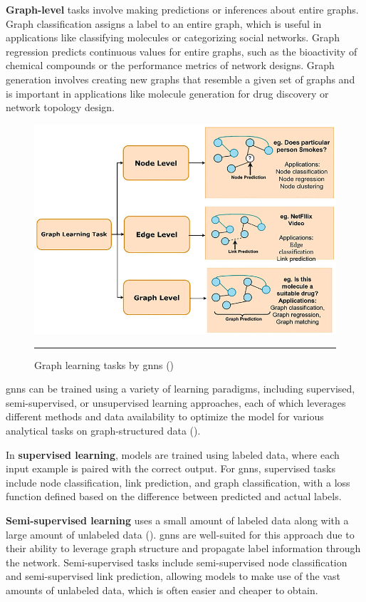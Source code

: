 \textbf{Graph-level} tasks involve making predictions or inferences about entire graphs.
Graph classification assigns a label to an entire graph, which is useful in applications like classifying molecules or categorizing social networks.
Graph regression predicts continuous values for entire graphs, such as the bioactivity of chemical compounds or the performance metrics of network designs.
Graph generation involves creating new graphs that resemble a given set of graphs and is important in applications like molecule generation for drug discovery or network topology design.

\begin{figure}[htbp]
    \centering
 \includegraphics[width=.9\textwidth]{03_Figures/literature-review/gnn-graph-learning-tasks-summary.png}
     \rule{35em}{0.5pt}
    \caption{Graph learning tasks by \glspl{gnn} (\cite{Khemani2024})} 
 \label{fig:gnn-graph-learning-tasks-summary}
\end{figure}

\glspl{gnn} can be trained using a variety of learning paradigms, including supervised, semi-supervised, or unsupervised learning approaches, each of which leverages different methods and data availability to optimize the model for various analytical tasks on graph-structured data (\cite{Zhou2020,Wu2021}).

In \textbf{supervised learning}, models are trained using labeled data, where each input example is paired with the correct output.
For \glspl{gnn}, supervised tasks include node classification, link prediction, and graph classification, with a loss function defined based on the difference between predicted and actual labels.

\textbf{Semi-supervised learning} uses a small amount of labeled data along with a large amount of unlabeled data (\cite{Kipf2017}).
\glspl{gnn} are well-suited for this approach due to their ability to leverage graph structure and propagate label information through the network.
Semi-supervised tasks include semi-supervised node classification and semi-supervised link prediction, allowing models to make use of the vast amounts of unlabeled data, which is often easier and cheaper to obtain.

